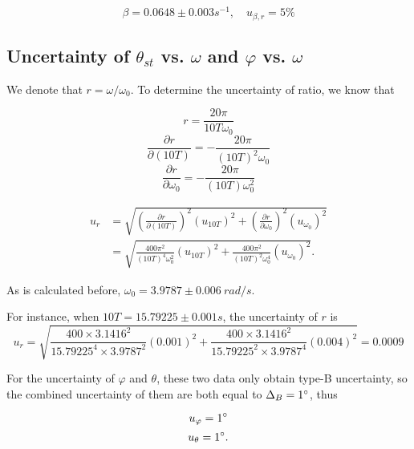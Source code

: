 \[
\beta=0.0648\pm 0.003s^{-1}, \quad u_{\beta,r}=5\%
\]



\subsection{Uncertainty of $\theta_{st}$ vs. $\omega$ and $\varphi$ vs. $\omega$}

We denote that $r=\omega/\omega_0$.
To determine the uncertainty of ratio, we know that

$$ r=\frac{20\pi}{10T\omega_0} $$ 
$$ \frac{\partial r}{\partial (10T)}=-\frac{20\pi}{(10T)^2\omega_0} $$ 
$$ \frac{\partial r}{\partial \omega_0}=-\frac{20\pi}{(10T)\omega_0^2} $$

\[
\begin{split}
u_{r}&=\sqrt{(\frac{\partial r}{\partial
    (10T)})^2(u_{10T})^2+(\frac{\partial r}{\partial
    \omega_0})^2(u_{\omega_0})^2}\\ 
&=\sqrt{\frac{400\pi^2}{(10T)^4\omega_0^2}(u_{10T})^2+\frac{400\pi^2}{(10T)^2\omega_0^4}(u_{\omega_0})^2}.
\end{split}
\]

As is calculated before, $\omega_0=3.9787 \pm 0.006 \ rad/s$.

For instance, when $10T= 15.79225  \pm 0.001s$, the uncertainty of $r$ is
\[
u_{r}=\sqrt{\frac{400\times3.1416^2}{15.79225 ^4\times 3.9787^2}(0.001)^2
  +\frac{400\times3.1416^2}{15.79225^2\times3.9787^4}(0.004)^2}=0.0009
\] 

For the uncertainty of $\varphi$ and $\theta$, these two data only obtain type-B
uncertainty, so the combined uncertainty of them are both equal to
$\Delta_B=1^\circ$, thus 

$$ u_{\varphi}=1^\circ $$
$$ u_{\theta}=1^\circ. $$
